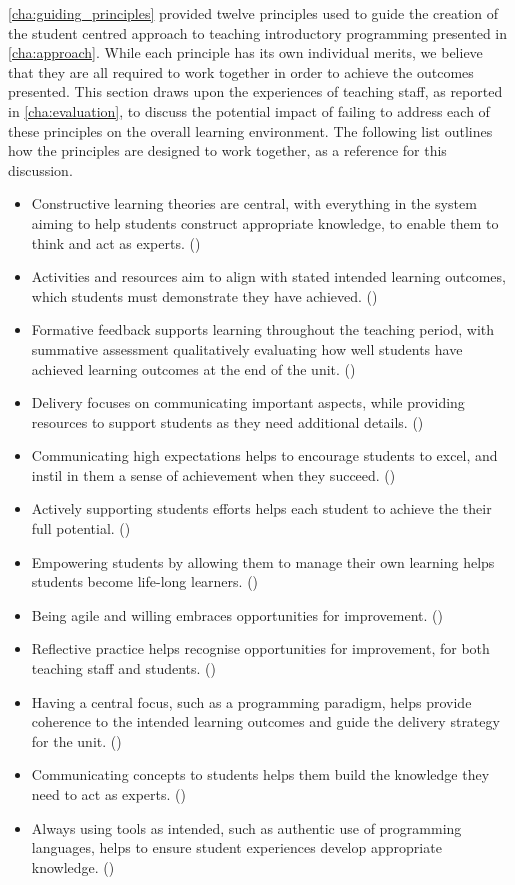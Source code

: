 \cref{cha:guiding_principles} provided twelve principles used to guide the creation of the student centred approach to teaching introductory programming presented in \cref{cha:approach}. While each principle has its own individual merits, we believe that they are all required to work together in order to achieve the outcomes presented. This section draws upon the experiences of teaching staff, as reported in \cref{cha:evaluation}, to discuss the potential impact of failing to address each of these principles on the overall learning environment. The following list outlines how the principles are designed to work together, as a reference for this discussion.

\begin{itemize}[noitemsep,nolistsep]
	\item Constructive learning theories are central, with everything in the system aiming to help students construct appropriate knowledge, to enable them to think and act as experts. ()
	\item Activities and resources aim to align with stated intended learning outcomes, which students must demonstrate they have achieved. ()
	\item Formative feedback supports learning throughout the teaching period, with summative assessment qualitatively evaluating how well students have achieved learning outcomes at the end of the unit. ()
	\item Delivery focuses on communicating important aspects, while providing resources to support students as they need additional details. ()
	\item Communicating high expectations helps to encourage students to excel, and instil in them a sense of achievement when they succeed. ()
	\item Actively supporting students efforts helps each student to achieve the their full potential.  ()
	\item Empowering students by allowing them to manage their own learning helps students become life-long learners. ()
	\item Being agile and willing embraces opportunities for improvement. ()
	\item Reflective practice helps recognise opportunities for improvement, for both teaching staff and students. ()
	\item Having a central focus, such as a programming paradigm, helps provide coherence to the intended learning outcomes and guide the delivery strategy for the unit.  ()
	\item Communicating concepts to students helps them build the knowledge they need to act as experts. ()
	\item Always using tools as intended, such as authentic use of programming languages, helps to ensure student experiences develop appropriate knowledge. ()
\end{itemize}

